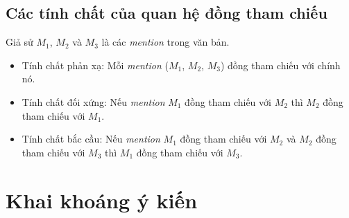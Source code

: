 \documentclass[12pt]{report}
\begin{document}
			\subsection*{Các tính chất của quan hệ đồng tham chiếu}
			Giả sử $M_1$, $M_2$ và $M_3$ là các \textit{mention} trong văn bản.
			\begin{itemize}
				\item{Tính chất phản xạ: Mỗi \textit{mention} ($M_1$, $M_2$, $M_3$) đồng tham chiếu với chính nó.}
				\item{Tính chất đối xứng: Nếu \textit{mention} $M_1$ đồng tham chiếu với $M_2$ thì $M_2$ đồng tham chiếu với $M_1$.}
				\item{Tính chất bắc cầu: Nếu \textit{mention} $M_1$ đồng tham chiếu với $M_2$ và $M_2$ đồng tham chiếu với $M_3$ thì $M_1$ đồng tham chiếu với $M_3$.}
			\end{itemize}
		\section{Khai khoáng ý kiến}
\end{document}
